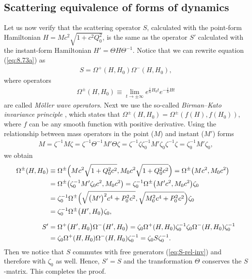 \documentclass[]{stefan1}
\begin{document}
\subsection{Scattering equivalence of forms of dynamics}\label{ss:form-equiv-point}
Let us now verify that the scattering operator $ S $, calculated with
the point-form Hamiltonian $ H = M c ^{2} \sqrt{1 + c ^{2}Q_{0}
^{2}} $, is the same as the operator $ S '$ calculated with the
instant-form Hamiltonian $ H' = \Theta H \Theta^{- 1} $. Notice that we
can rewrite equation (\ref{eq:8.73a}) as
%
\begin{align*}
S = \Omega^{+}(H, H_{0}) \Omega^{-}( H,
H_{0}),
\end{align*}
where operators
%
\begin{align*}
\Omega^{\pm }(H, H_{0}) \equiv \lim_{t \to \pm \infty }
e^{\frac{i}{
\hbar }H_{0} t} e^{-\frac{i}{\hbar }Ht}
\end{align*}
are called \emph{M\"{o}ller} \emph{wave} \emph{operators}.
 Next we use the so-called
\emph{Birman}--\emph{Kato} \emph{invariance} \emph{principle}
 \cite{Dollard}, which
states that $ \Omega^{\pm } (H, H_{0}) = \Omega^{ \pm } (f (H), f (H
_{0})) $, where $ f $ can be any smooth function with positive
derivative. Using the relationship between mass operators in the point
($ M $) and instant ($ M '$) forms
%
\begin{align*}
M = \zeta^{-1} M \zeta = \zeta^{-1} \Theta^{-1}
M' \Theta \zeta = \zeta^{-1} \zeta \zeta_{0}^{-1}
M' \zeta_{0} \zeta^{-1} \zeta = \zeta
_{0}^{-1} M' \zeta_{0},
\end{align*}
we obtain
%
\begin{align*}
\Omega^{\pm }(H, H_{0}) &\equiv \Omega^{\pm } \Bigl(
M c^{2}\sqrt{1+ Q_{0}^{2}c^{2}},
M_{0}c^{2} \sqrt{1+ Q_{0}^{2}c^{2}}
\Bigr) = \Omega^{\pm } \bigl( Mc^{2}, M_{0}c^{2}
\bigr)
\\
&= \Omega^{\pm } \bigl( \zeta_{0}^{-1}
M' \zeta_{0} c^{2} , M_{0}c
^{2} \bigr) = \zeta_{0} ^{-1}
\Omega^{\pm } \bigl( M'c^{2}, M_{0}c^{2}
\bigr) \zeta_{0}
\\
&= \zeta_{0} ^{-1} \Omega^{\pm } \Bigl( \sqrt
{\bigl(M'\bigr)^{2} c^{4} + P
_{0}^{2}c^{2}}, \sqrt{M_{0}^{2}
c^{4} + P_{0}^{2}c^{2}} \Bigr) \zeta
_{0}
\\
&= \zeta_{0} ^{-1} \Omega^{\pm } \bigl(
H', H_{0} \bigr) \zeta_{0},
\\[1.5ex]
S' &= \Omega^{+} \bigl( H',
H_{0} \bigr) \Omega^{-} \bigl( H',
H_{0} \bigr) = \zeta_{0} \Omega^{+}(H,
H_{0}) \zeta_{0}^{-1} \zeta _{0}
\Omega^{-}(H, H_{0}) \zeta_{0}^{-1}
\\
&= \zeta_{0} \Omega^{+}(H, H_{0})
\Omega^{-}(H, H_{0}) \zeta_{0}^{-1} =
\zeta_{0} S \zeta_{0}^{-1}.
\end{align*}
Then we notice that $S$ commutes with free generators
(\ref{eq:S-rel-inv}) and therefore with $\zeta_{0}$ as well. Hence,
$S' = S$ and the transformation $\Theta $ conserves the $S$-matrix. This
completes the proof.
\end{document}
